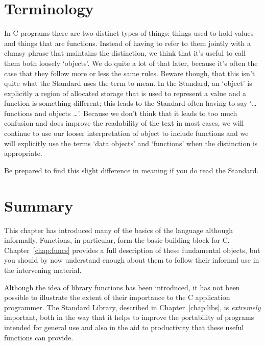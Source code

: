  
        \section{Terminology}
        

  

  In C programs there are two distinct types of things: things used to hold
   values and things that are functions. Instead of having to refer to them
   jointly with a clumsy phrase that maintains the distinction, we think that
   it's useful to call them both loosely `objects'. We do quite a lot of
   that later, because it's often the case that they follow more or less the
   same rules. Beware though, that this isn't quite what the Standard uses the
   term to mean. In the Standard, an `object' is explicitly a region of
   allocated storage that is used to represent a value and a function is
   something different; this leads to the Standard often having to say
   `\ldots  functions and objects \ldots '. Because we don't think
   that it leads to too much confusion and does improve the readability of the
   text in most cases, we will continue to use our looser interpretation of
   object to include functions and we will explicitly use the terms `data
   objects' and `functions' when the distinction is appropriate.


  Be prepared to find this slight difference in meaning if you do read the
   Standard.


 
        \section{Summary}
        


  This chapter has introduced many of the basics of the language although
   informally. Functions, in particular, form the basic building block for C.
   Chapter~\ref{chap:funcs} provides a full description of these fundamental
   objects, but you should by now understand enough about them to follow their
   informal use in the intervening material.


  Although the idea of library functions has been introduced, it has not
   been possible to illustrate the extent of their importance to the C
   application programmer.
   The Standard Library, described in Chapter~\ref{chap:libs},
   is \textit{extremely} important, both in the way that it helps to
   improve the portability of programs intended for general use and also in
   the aid to productivity that these useful functions can provide.


